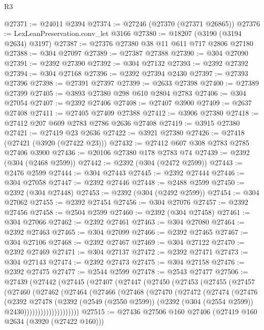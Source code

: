 \begin{lexlean}{R3}
\begin{coremodule}
@27371 := @24011 @2394
@27374 := @27246 (@27370 (@27371 @26865))
@27376 := LexLeanPreservation.conv_let @3166
@27380 := @18207 (@3190 (@3194 @2634) @3197)
@27387 := @27376 @27380 @38 @11 @611 @717 @2806 @27180
@27388 := @304 @27097
@27389 := @27387 @27388
@27390 := @304 @27090
@27391 := @2392 @27390
@27392 := @304 @27132
@27393 := @2392 @27392
@27394 := @304 @27168
@27396 := @2392 @27394 @2430
@27397 := @27393 @27396
@27398 := @27391 @27397
@27399 := @2633 @27398
@27400 := @27389 @27399
@27405 := @3893 @27380 @298 @610 @2804 @2783
@27406 := @304 @27054
@27407 := @2392 @27406
@27408 := @27407 @3900
@27409 := @2637 @27408
@27411 := @27405 @27409 @27388
@27412 := @3906 @27380
@27418 := @27412 @207 @609 @2783 @2786 @2636 @27408
@27419 := @3915 @27380
@27421 := @27419 @23 @2636
@27422 := @3921 @27380
@27426 := @27418 (@27421 (@3920 (@27422 @23)))
@27432 := @27412 @607 @308 @2783 @2785 @27406 @3900
@27436 := @20106 @27380 @178 @2783 @74
@27439 := @2392 (@304 (@2468 @2599))
@27442 := @2392 (@304 (@2472 @2599))
@27443 := @2476 @2599
@27444 := @304 @27443
@27445 := @2392 @27444
@27446 := @304 @27058
@27447 := @2392 @27446
@27448 := @2488 @2599
@27450 := @2392 (@304 @27448)
@27453 := @2392 (@304 (@2492 @2599))
@27454 := @304 @27062
@27455 := @2392 @27454
@27456 := @304 @27076
@27457 := @2392 @27456
@27458 := @2504 @2599
@27460 := @2392 (@304 @27458)
@27461 := @304 @27066
@27462 := @2392 @27461
@27463 := @304 @27080
@27464 := @2392 @27463
@27465 := @304 @27099
@27466 := @2392 @27465
@27467 := @304 @27106
@27468 := @2392 @27467
@27469 := @304 @27122
@27470 := @2392 @27469
@27471 := @304 @27137
@27472 := @2392 @27471
@27473 := @304 @27143
@27474 := @2392 @27473
@27475 := @304 @27158
@27476 := @2392 @27475
@27477 := @2544 @2599
@27478 := @2543 @27477
@27506 := @27439
    (@27442
      (@27445
        (@27407
          (@27447
            (@27450
              (@27453
                (@27455
                  (@27457
                    (@27460
                      (@27462
                        (@27464
                          (@27466
                            (@27468
                              (@27470
                                (@27472
                                  (@27474
                                    (@27476
                                      (@2392
                                        @27478
                                        (@2392
                                          (@2549 (@2550 @2599))
                                          (@2392 (@304 (@2554 @2599)) @2430))))))))))))))))))))
@27515 := @27436 @27506 @160 @27406 (@27419 @160 @2634 (@3920 (@27422 @160)))

\end{coremodule}
\end{lexlean}
